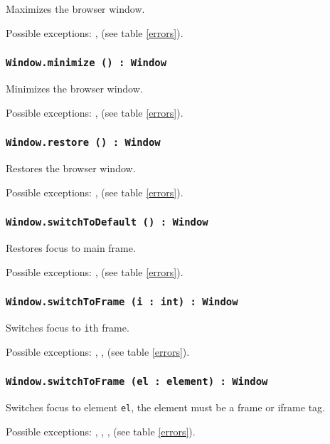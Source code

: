 Maximizes the browser window.

Possible exceptions: ,  (see table \ref{errors}).

\subsubsection{\texttt{Window.minimize () : Window}}

Minimizes the browser window.

Possible exceptions: ,  (see table \ref{errors}).

\subsubsection{\texttt{Window.restore () : Window}}

Restores the browser window.

Possible exceptions: ,  (see table \ref{errors}).

\subsubsection{\texttt{Window.switchToDefault () : Window}}

Restores focus to main frame.

Possible exceptions: ,  (see table \ref{errors}).

\subsubsection{\texttt{Window.switchToFrame (i : int) : Window}}

Switches focus to \texttt{i}th frame.

Possible exceptions: , ,  (see table \ref{errors}).

\subsubsection{\texttt{Window.switchToFrame (el : element) : Window}}

Switches focus to element \texttt{el}, the element must be a frame or iframe tag.

Possible exceptions: , , ,  (see table \ref{errors}).

